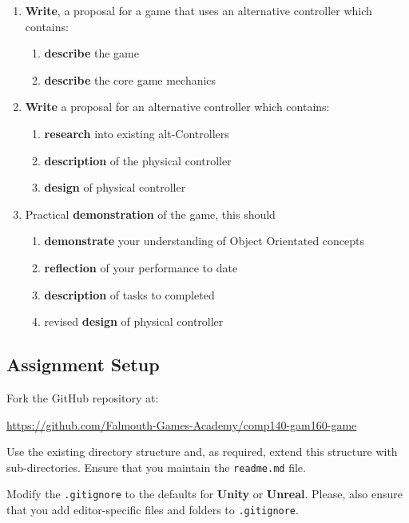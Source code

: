 \documentclass{../../fal_assignment}
\begin{document}
	\begin{enumerate}[label=(\Alph*)]
		\item \textbf{Write}, a proposal for a game that uses an alternative controller which contains:
		\begin{enumerate}[label=\roman*.]
			\item \textbf{describe} the game
			\item \textbf{describe} the core game mechanics
		\end{enumerate}
		\item \textbf{Write} a proposal for an alternative controller which contains: 
		\begin{enumerate}[label=\roman*.]
			\item \textbf{research} into existing alt-Controllers
			\item \textbf{description} of the physical controller
			\item \textbf{design} of physical controller
		\end{enumerate}
		\item Practical \textbf{demonstration} of the game, this should
		\begin{enumerate}[label=\roman*.]
			\item \textbf{demonstrate} your understanding of Object Orientated concepts
			\item \textbf{reflection} of your performance to date
			\item \textbf{description} of tasks to completed
			\item revised \textbf{design} of physical controller
		\end{enumerate}
	\end{enumerate}
	
	\subsection*{Assignment Setup}
	
	Fork the GitHub repository at:
	
	\indent \url{https://github.com/Falmouth-Games-Academy/comp140-gam160-game}
	
	Use the existing directory structure and, as required, extend this structure with sub-directories. Ensure that you maintain the \texttt{readme.md} file.
	
	Modify the \texttt{.gitignore} to the defaults for \textbf{Unity} or \textbf{Unreal}. Please, also ensure that you add editor-specific files and folders to \texttt{.gitignore}. 
	
\end{document}
